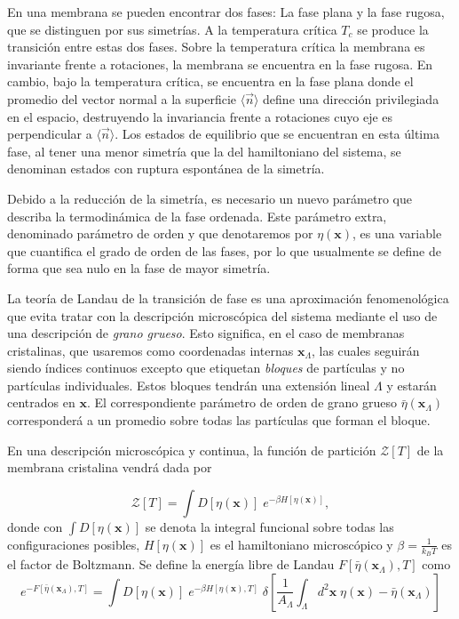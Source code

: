 En una membrana se pueden encontrar dos fases: La fase plana y la fase
rugosa, que se distinguen por sus simetrías. A la temperatura crítica $T_c$ se
produce la transición entre estas dos fases. Sobre la temperatura crítica la
membrana es invariante frente a rotaciones, 
la membrana se encuentra en la fase rugosa. En cambio, bajo la temperatura
crítica, se encuentra en la fase plana donde el promedio del vector normal a
la superficie $\langle \vec{n}\rangle$ define una dirección privilegiada en el
espacio, destruyendo la invariancia frente a rotaciones cuyo eje es
perpendicular a $\langle \vec{n}\rangle$. Los estados de equilibrio que se
encuentran en esta última fase, al tener una menor simetría que la del
hamiltoniano del sistema, se denominan estados con ruptura espontánea de la
simetría. 
 
Debido a la reducción de la simetría, es necesario un nuevo parámetro que 
describa la termodinámica de la fase ordenada. Este parámetro
extra, denominado parámetro de orden y que denotaremos por $\eta(\mathbf{x})$,
es una 
variable que cuantifica el grado de orden de
las fases, por lo que usualmente se define de forma que sea nulo en la fase
de mayor simetría.

\begin{figure}[h]
\centering
{}
\quad
{}
\end{figure}

La teoría de Landau de la transición de fase es una aproximación
fenomenológica que evita tratar con la descripción microscópica del sistema
mediante el uso de una descripción de \textit{grano grueso}. Esto significa,
en el caso de membranas cristalinas, que usaremos como coordenadas internas
$\mathbf{x}_{\Lambda}$, las cuales seguirán  siendo índices continuos excepto
que etiquetan \textit{bloques} de partículas y no partículas
individuales. Estos bloques tendrán una extensión lineal $\Lambda$ y estarán
centrados en $\mathbf{x}$. El correspondiente parámetro de orden de grano
grueso $\bar{\eta}(\mathbf{x}_{\Lambda})$ corresponderá a un promedio sobre
todas las partículas que forman el bloque.

En una descripción microscópica y continua, la función de partición
$\mathcal{Z}[T]$ de la membrana cristalina vendrá dada por

\begin{equation}\label{Zmicroscopica}
\mathcal{Z}[T]=\int D[\eta(\mathbf{x})]\; e^{-\beta H[\eta(\mathbf{x})]},
\end{equation}
donde con $\int D[\eta(\mathbf{x})]$ se denota la integral funcional sobre
todas las configuraciones posibles, $H[\eta(\mathbf{x})]$ es el hamiltoniano
microscópico y $\beta=\frac{1}{k_BT}$ es el factor de Boltzmann. Se define la
energía libre de Landau 
$F[\bar{\eta}(\mathbf{x}_{\Lambda}),T]$ como 
\begin{equation*}
e^{-F[\bar{\eta}(\mathbf{x}_{\Lambda}),T]}=\int D[\eta(\mathbf{x})]\; e^{-\beta
  H[\eta(\mathbf{x}),T]}
  \;\delta\left[\frac{1}{A_{\Lambda}}\int_{\Lambda} d^2\mathbf{x}\; \eta(\mathbf{x})-\bar{\eta}(\mathbf{x}_{\Lambda})\right]
\end{equation*}

